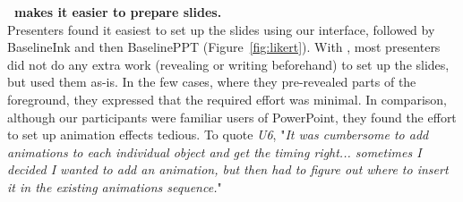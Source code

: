 %
\textbf{\interface\ makes it easier to prepare slides.}\\
Presenters found it easiest to set up the slides using our interface, followed by BaselineInk and then BaselinePPT (Figure~\ref{fig:likert}). With \interface, most presenters did not do any extra work (revealing or writing beforehand) to set up the slides, but used them as-is. In the few cases, where they pre-revealed parts of the foreground, they expressed that the required effort was minimal. 
%
In comparison, although our participants were familiar users of PowerPoint, they found the effort to set up animation effects tedious. To quote \textit{U6}, "\textit{It was cumbersome to add animations to each individual object and get the timing right... sometimes I decided I wanted to add an animation, but then had to figure out where to insert it in the existing animations sequence.}"
